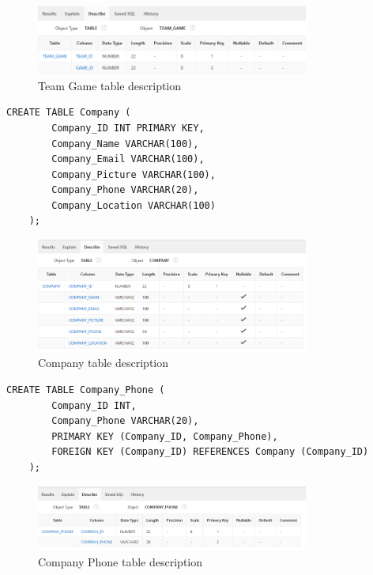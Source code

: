 \begin{figure}[H]
    \centering
    \includegraphics[width=0.8\textwidth]{images/TableDesc/TEAM_GAME.png}
    \caption{Team Game table description}
    \label{fig:team_game_table}
\end{figure}
\begin{lstlisting}[caption={Create Company table}, label={lst:create_company}]
    CREATE TABLE Company (
        Company_ID INT PRIMARY KEY,
        Company_Name VARCHAR(100),
        Company_Email VARCHAR(100),
        Company_Picture VARCHAR(100),
        Company_Phone VARCHAR(20),
        Company_Location VARCHAR(100)
    );
    \end{lstlisting}
\begin{figure}[H]
    \centering
    \includegraphics[width=0.8\textwidth]{images/TableDesc/COMPANY.png}
    \caption{Company table description}
    \label{fig:company_table}
\end{figure}
\begin{lstlisting}[caption={Create Company Phone table}, label={lst:create_company_phone}]
    CREATE TABLE Company_Phone (
        Company_ID INT,
        Company_Phone VARCHAR(20),
        PRIMARY KEY (Company_ID, Company_Phone),
        FOREIGN KEY (Company_ID) REFERENCES Company (Company_ID)
    );
    \end{lstlisting}
\begin{figure}[H]
    \centering
    \includegraphics[width=0.8\textwidth]{images/TableDesc/CompanyPhone.png}
    \caption{Company Phone table description}
    \label{fig:company_phone_table}
\end{figure}

